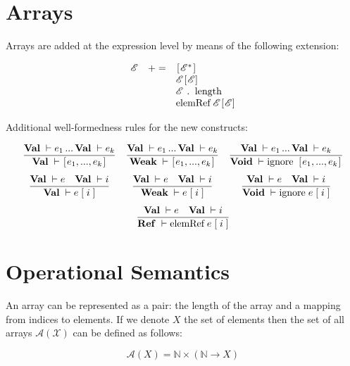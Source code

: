 \documentclass{article}
\author{Dmitry Boulytchev}
\newcommand{\trule}[2]{\dfrac{#1}{#2}}
\newcommand{\withenv}[2]{{#1}\vdash{#2}}
\newcommand{\llang}[1]{\mbox{\lstinline[mathescape]|#1|}}
\newcommand{\primi}[2]{\mathbf{#1}\;{#2}}
\theoremstyle{definition}
\begin{document}
\section{Arrays}

Arrays are added at the expression level by means of the following extension:

\[
\begin{array}{rcl}
  \mathscr E & += & \llang{[}\mathscr E^*\llang{]} \\
             &    & \mathscr E \llang{[$\mathscr E$]} \\
             &    & \mathscr E \;\llang{. length} \\
             &    & \llang{elemRef}\; \mathscr E\llang{[$\mathscr E$]}
\end{array}
\]

Additional well-formedness rules for the new constructs:

\newcommand{\Ref}{\primi{Ref}{}}
\newcommand{\Val}{\primi{Val}{}}
\newcommand{\Void}{\primi{Void}{}}
\newcommand{\Weak}{\primi{Weak}{}}

\[
\begin{array}{ccc}
  \trule{\withenv{\Val}{e_1}\,...\,\withenv{\Val}{e_k}}{\withenv{\Val}{\llang{[}e_1,...,e_k\llang{]}}} &
  \trule{\withenv{\Val}{e_1}\,...\,\withenv{\Val}{e_k}}{\withenv{\Weak}{\llang{[}e_1,...,e_k\llang{]}}} &
  \trule{\withenv{\Val}{e_1}\,...\,\withenv{\Val}{e_k}}{\withenv{\Void}{\llang{ignore [}e_1,...,e_k\llang{]}}} \\[5mm]
  \trule{\withenv{\Val}{e}\quad\withenv{\Val}{i}}{\withenv{\Val}{\llang{$e\;$[$\;i\;$]}}} &
  \trule{\withenv{\Val}{e}\quad\withenv{\Val}{i}}{\withenv{\Weak}{\llang{$e\;$[$\;i\;$]}}} &
  \trule{\withenv{\Val}{e}\quad\withenv{\Val}{i}}{\withenv{\Void}{\llang{ignore $\;e\;$[$\;i\;$]}}}\\[5mm]
  \multicolumn{3}{c}{\trule{\withenv{\Val}{e}\quad\withenv{\Val}{i}}{\withenv{\Ref}{\llang{elemRef $\;e\;$[$\;i\;$]}}}}
\end{array}
\]

\section{Operational Semantics}

An array can be represented as a pair: the length of the array and a mapping from indices to elements. If we denote
$X$ the set of elements then the set of all arrays $\mathscr A (\mathscr X)$ can be defined as follows:

\[
\mathscr A(X) = \mathbb N \times (\mathbb N \to X)
\]
\end{document}

